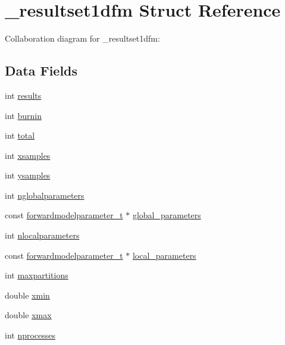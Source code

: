 \hypertarget{struct__resultset1dfm}{}\section{\+\_\+resultset1dfm Struct Reference}
\label{struct__resultset1dfm}


Collaboration diagram for \+\_\+resultset1dfm\+:
\subsection*{Data Fields}
\begin{DoxyCompactItemize}
\item 
int \hyperlink{struct__resultset1dfm_a85df836eee4586560d60c48f1b0db18d}{results}
\item 
int \hyperlink{struct__resultset1dfm_ac508f47e9939e53ba04095f440f3cc40}{burnin}
\item 
int \hyperlink{struct__resultset1dfm_a5d28e0bc99107bfa56c1a2c9a3d396ee}{total}
\item 
int \hyperlink{struct__resultset1dfm_ac46e8e3d7ddd1db6b6aa33458ef219ea}{xsamples}
\item 
int \hyperlink{struct__resultset1dfm_a21e88b0c502b9145a86a57a016b3daf6}{ysamples}
\item 
int \hyperlink{struct__resultset1dfm_a7383532ed70917d51d6f99036eca98b0}{nglobalparameters}
\item 
const \hyperlink{forwardmodelparameter_8h_a18a7d2fd51fab097145725d83ac328e3}{forwardmodelparameter\+\_\+t} $\ast$ \hyperlink{struct__resultset1dfm_ac0512f402d548dc832a201bad68d9dad}{global\+\_\+parameters}
\item 
int \hyperlink{struct__resultset1dfm_a576efbe00bd3e77e8a80c6e275e2f72a}{nlocalparameters}
\item 
const \hyperlink{forwardmodelparameter_8h_a18a7d2fd51fab097145725d83ac328e3}{forwardmodelparameter\+\_\+t} $\ast$ \hyperlink{struct__resultset1dfm_acdda95a91c2722e8dae38e82a955d1f0}{local\+\_\+parameters}
\item 
int \hyperlink{struct__resultset1dfm_ab9a205a37ed1e99e0f292a8a81e4fa8a}{maxpartitions}
\item 
double \hyperlink{struct__resultset1dfm_a9e1fe0d3ff10ba63d5616d65dce41589}{xmin}
\item 
double \hyperlink{struct__resultset1dfm_ade4d1f92f73dffdbe895a37491976102}{xmax}
\item 
int \hyperlink{struct__resultset1dfm_a881dce3156e105e5a37de87f25a6b6ab}{nprocesses}

\end{DoxyCompactItemize}
